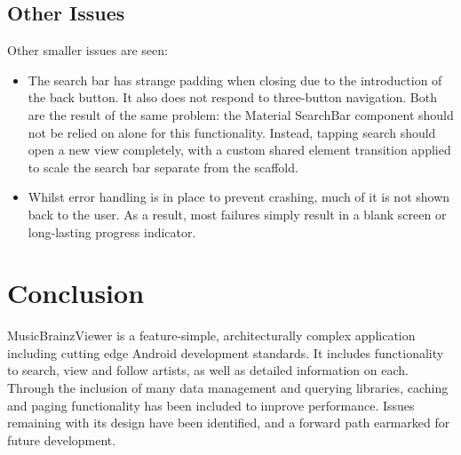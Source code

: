 \documentclass[]{article}
\begin{document}
\subsection{Other Issues}
Other smaller issues are seen:
\begin{itemize}
	\item The search bar has strange padding when closing due to the introduction of the back button. It also does not respond to three-button navigation. Both are the result of the same problem: the Material SearchBar component should not be relied on alone for this functionality. Instead, tapping search should open a new view completely, with a custom shared element transition applied to scale the search bar separate from the scaffold.
	\item Whilst error handling is in place to prevent crashing, much of it is not shown back to the user. As a result, most failures simply result in a blank screen or long-lasting progress indicator.
\end{itemize}

\section{Conclusion}
MusicBrainzViewer is a feature-simple, architecturally complex application including cutting edge Android development standards. It includes functionality to search, view and follow artists, as well as detailed information on each. Through the inclusion of many data management and querying libraries, caching and paging functionality has been included to improve performance. Issues remaining with its design have been identified, and a forward path earmarked for future development.
\end{document}
